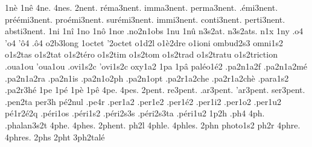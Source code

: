 {1nè
1nê
4ne.
4nes.
      2nent. %
  réma3nent.
  imma3nent.
 perma3nent.
  .émi3nent.
préémi3nent.
proémi3nent.
surémi3nent.
  immi3nent.
 conti3nent.
 perti3nent.
 absti3nent.
%
1ni
1nî
1no
1nô
1nœ
                    .no2n1obs
1nu
1nû
                    n3s2at.
                    n3s2ats.
n1x
1ny
.o4
'o4
'ô4
.ô4
                    o2b3long
                    1octet %
                    '2octet
                    o1d2l
                    o1è2dre
                    o1ioni
                    ombud2s3
                    omni1s2
                    o1s2tas
                    o1s2tat
                    o1s2téro
                    o1s2tim
                    o1s2tom
                    o1s2trad
                    o1s2tratu
                    o1s2triction
                    .oua1ou
                    'oua1ou
                    .ovi1s2c
                    'ovi1s2c
                    oxy1a2
1pa
1pâ
                    paléo1é2
                    .pa2n1a2f
                    .pa2n1a2mé
                    .pa2n1a2ra
                    .pa2n1is
                    .pa2n1o2ph
                    .pa2n1opt
                    .pa2r1a2che
                    .pa2r1a2chè
                    .para1s2
                    .pa2r3hé
1pe
1pé
1pè
1pê
4pe.
4pes.
   2pent.
 re3pent.
.ar3pent.
'ar3pent.
ser3pent.
%
                    .pen2ta %
                    per3h
                    pé2nul %
                    .pe4r
                    .per1a2
                    .per1e2
                    .per1é2
                    .per1i2
                    .per1o2
                    .per1u2
                    pé1r2é2q %
                    .péri1os
                    .péri1s2
                    .péri2s3s
                    .péri2s3ta
                    .péri1u2
1p2h
.ph4
4ph.
                    .phalan3s2t
4phe.
4phes.
2phent. %
ph2l
4phle.
4phles.
2phn
                    photo1s2
ph2r
4phre.
4phres.
2phs
2pht
                    3ph2talé
}
